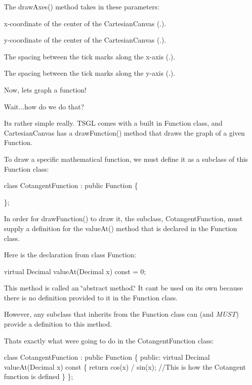 The draw\+Axes() method takes in these parameters\+:
\begin{DoxyItemize}
\item x-\/coordinate of the center of the Cartesian\+Canvas ({.}).
\item y-\/coordinate of the center of the Cartesian\+Canvas ({.}).
\item The spacing between the tick marks along the x-\/axis ({.}).
\item The spacing between the tick marks along the y-\/axis ({.}).
\end{DoxyItemize}

Now, let\textquotesingle{}s graph a function!

Wait...how do we do that?

It\textquotesingle{}s rather simple really. T\+S\+G\+L comes with a built in Function class, and Cartesian\+Canvas has a draw\+Function() method that draws the graph of a given Function.

To draw a specific mathematical function, we must define it as a subclass of this Function class\+:


\begin{DoxyCode}
\textcolor{keyword}{class }CotangentFunction : \textcolor{keyword}{public} Function \{

\};
\end{DoxyCode}


In order for draw\+Function() to draw it, the subclass, Cotangent\+Function, must supply a definition for the value\+At() method that is declared in the Function class.

Here is the declaration from class Function\+:


\begin{DoxyCode}
\textcolor{keyword}{virtual} Decimal valueAt(Decimal x) \textcolor{keyword}{const} = 0;
\end{DoxyCode}


This method is called an \char`\"{}abstract method.\char`\"{} It can\textquotesingle{}t be used on its own because there is no definition provided to it in the Function class.

However, any subclass that inherits from the Function class can (and {\itshape M\+U\+S\+T}) provide a definition to this method.

That\textquotesingle{}s exactly what we\textquotesingle{}re going to do in the Cotangent\+Function class\+:


\begin{DoxyCode}
\textcolor{keyword}{class }CotangentFunction : \textcolor{keyword}{public} Function \{
 \textcolor{keyword}{public}:
    \textcolor{keyword}{virtual} Decimal valueAt(Decimal x)\textcolor{keyword}{ const }\{
      \textcolor{keywordflow}{return} cos(x) / sin(x);  \textcolor{comment}{//This is how the Cotangent function is defined}
    \}
\};
\end{DoxyCode}


